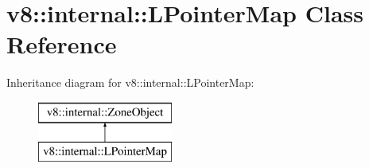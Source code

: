 \hypertarget{classv8_1_1internal_1_1_l_pointer_map}{}\section{v8\+:\+:internal\+:\+:L\+Pointer\+Map Class Reference}
\label{classv8_1_1internal_1_1_l_pointer_map}
Inheritance diagram for v8\+:\+:internal\+:\+:L\+Pointer\+Map\+:\begin{figure}[H]
\begin{center}
\leavevmode
\includegraphics[height=2.000000cm]{classv8_1_1internal_1_1_l_pointer_map}
\end{center}
\end{figure}
